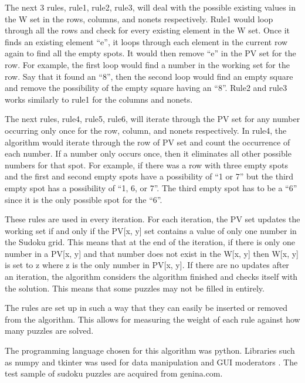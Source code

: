 \documentclass[twocolumn]{article}
\begin{document}
The next 3 rules, rule1, rule2, rule3, will deal with the possible existing values in the W set in the rows, columns, and nonets respectively. Rule1 would loop through all the rows and check for every existing element in the W set. Once it finds an existing element ``e'', it loops through each element in the current row again to find all the empty spots. It would then remove ``e'' in the PV set for the row. For example, the first loop would find a number in the working set for the row. Say that it found an ``8'', then the second loop would find an empty square and remove the possibility of the empty square having an ``8''. Rule2 and rule3 works similarly to rule1 for the columns and nonets.

The next rules, rule4, rule5, rule6, will iterate through the PV set for any number occurring only once for the row, column, and nonets respectively. In rule4, the algorithm would iterate through the row of PV set and count the occurrence of each number. If a number only occurs once, then it eliminates all other possible numbers for that spot. For example, if there was a row with three empty spots and the first and second empty spots have a possibility of ``1 or 7'' but the third empty spot has a possibility of ``1, 6, or 7''. The third empty spot has to be a ``6'' since it is the only possible spot for the ``6''.

These rules are used in every iteration. For each iteration, the PV set updates the working set if and only if the PV[x, y] set contains a value of only one number in the Sudoku grid. This means that at the end of the iteration, if there is only one number in a PV[x, y] and that number does not exist in the W[x, y] then W[x, y] is set to z where z is the only number in PV[x, y]. If there are no updates after an iteration, the algorithm considers the algorithm finished and checks itself with the solution. This means that some puzzles may not be filled in entirely.

The rules are set up in such a way that they can easily be inserted or removed from the algorithm. This allows for measuring the weight of each rule against how many puzzles are solved. 

The programming language chosen for this algorithm was python. Libraries such as numpy and tkinter was used for data manipulation and GUI moderators \cite{numpy}\cite{tkinter}. The test sample of sudoku puzzles are acquired from genina.com. 
\end{document}
